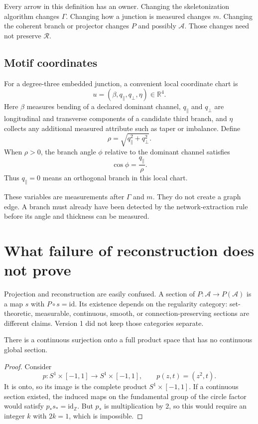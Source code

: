 \documentclass[11pt]{article}
\newcommand{\Adm}{\mathcal A}
\newcommand{\Image}{\mathcal R}
\newcommand{\R}{\mathbb R}
\newcommand{\Sone}{S^1}
\begin{document}
Every arrow in this definition has an owner.  Changing the skeletonization
algorithm changes $\Gamma$.  Changing how a junction is measured changes
$m$.  Changing the coherent branch or projector changes $P$ and possibly
$\Adm$.  Those changes need not preserve $\Image$.

\subsection{Motif coordinates}

For a degree-three embedded junction, a convenient local coordinate chart is
\[
  u=(\beta,q_\parallel,q_\perp,\eta)\in\R^4.
\]
Here $\beta$ measures bending of a declared dominant channel,
$q_\parallel$ and $q_\perp$ are longitudinal and transverse components of a
candidate third branch, and $\eta$ collects any additional measured
attribute such as taper or imbalance.  Define
\[
  \rho=\sqrt{q_\parallel^2+q_\perp^2}.
\]
When $\rho>0$, the branch angle $\phi$ relative to the dominant channel
satisfies
\[
  \cos\phi=\frac{q_\parallel}{\rho}.
\]
Thus $q_\parallel=0$ means an orthogonal branch in this local chart.

These variables are measurements after $\Gamma$ and $m$.  They do not
create a graph edge.  A branch must already have been detected by the
network-extraction rule before its angle and thickness can be measured.

\section{What failure of reconstruction does not prove}

Projection and reconstruction are easily confused.  A section of
$P:\Adm\to P(\Adm)$ is a map $s$ with $P\circ s=\mathrm{id}$.  Its existence
depends on the regularity category: set-theoretic, measurable, continuous,
smooth, or connection-preserving sections are different claims.  Version 1
did not keep those categories separate.

\begin{proposition}
There is a continuous surjection onto a full product space that has no
continuous global section.
\end{proposition}

\begin{proof}
Consider
\[
  p:\Sone\times[-1,1]\longrightarrow\Sone\times[-1,1],
  \qquad p(z,t)=(z^2,t).
\]
It is onto, so its image is the complete product
$\Sone\times[-1,1]$.  If a continuous section existed, the induced maps on
the fundamental group of the circle factor would satisfy
$p_\ast s_\ast=\mathrm{id}_{\mathbb Z}$.  But $p_\ast$ is multiplication by
$2$, so this would require an integer $k$ with $2k=1$, which is impossible.
\end{proof}
\end{document}
